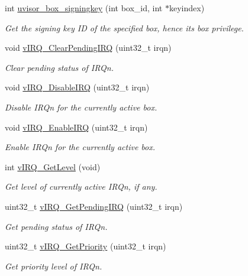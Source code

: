 \begin{DoxyCompactItemize}
int \hyperlink{group__hypervisor_ga82e5cbff1a1a26974ed1e5f493607cf2}{uvisor\+\_\+box\+\_\+signingkey} (int box\+\_\+id, int $\ast$keyindex)
\begin{DoxyCompactList}\small\item\em Get the signing key ID of the specified box, hence its box privilege. \end{DoxyCompactList}\item
void \hyperlink{group__hypervisor_gaa02ff863ab222f97723b60e59f6d92d8}{v\+I\+R\+Q\+\_\+\+Clear\+Pending\+I\+RQ} (uint32\+\_\+t irqn)
\begin{DoxyCompactList}\small\item\em Clear pending status of I\+R\+Qn. \end{DoxyCompactList}\item
void \hyperlink{group__hypervisor_ga7beb8d1fe68378367bcb8085a2d16cd5}{v\+I\+R\+Q\+\_\+\+Disable\+I\+RQ} (uint32\+\_\+t irqn)
\begin{DoxyCompactList}\small\item\em Disable I\+R\+Qn for the currently active box. \end{DoxyCompactList}\item
void \hyperlink{group__hypervisor_ga3dd01fda80a57db36a78994d0cae91ee}{v\+I\+R\+Q\+\_\+\+Enable\+I\+RQ} (uint32\+\_\+t irqn)
\begin{DoxyCompactList}\small\item\em Enable I\+R\+Qn for the currently active box. \end{DoxyCompactList}\item
int \hyperlink{group__hypervisor_ga880e3229f62cfff1c638c5dd6a1e9050}{v\+I\+R\+Q\+\_\+\+Get\+Level} (void)
\begin{DoxyCompactList}\small\item\em Get level of currently active I\+R\+Qn, if any. \end{DoxyCompactList}\item
uint32\+\_\+t \hyperlink{group__hypervisor_gad450b31ead2ec4f7bb2dbe07ebcfd8e7}{v\+I\+R\+Q\+\_\+\+Get\+Pending\+I\+RQ} (uint32\+\_\+t irqn)
\begin{DoxyCompactList}\small\item\em Get pending status of I\+R\+Qn. \end{DoxyCompactList}\item
uint32\+\_\+t \hyperlink{group__hypervisor_ga3da0be917ac42157f0d33e3e1412379b}{v\+I\+R\+Q\+\_\+\+Get\+Priority} (uint32\+\_\+t irqn)
\begin{DoxyCompactList}\small\item\em Get priority level of I\+R\+Qn. \end{DoxyCompactList}\item

\end{DoxyCompactItemize}
